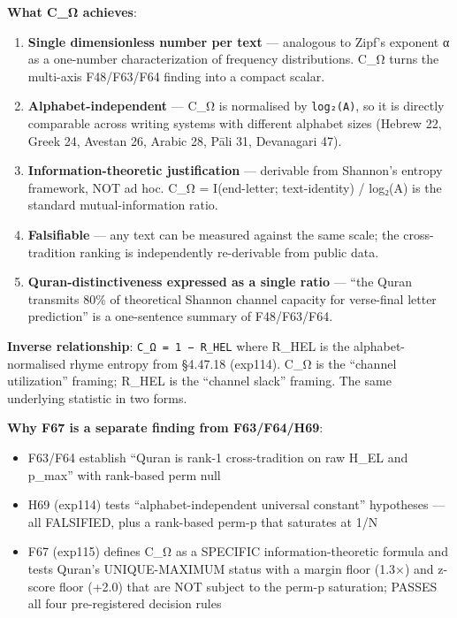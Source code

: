 \documentclass[
]{article}
\providecommand{\tightlist}{%
  \setlength{\itemsep}{0pt}\setlength{\parskip}{0pt}}
\begin{document}
\textbf{What C\_Ω achieves}:

\begin{enumerate}
\def\labelenumi{\arabic{enumi}.}
\item
  \textbf{Single dimensionless number per text} --- analogous to Zipf's
  exponent α as a one-number characterization of frequency
  distributions. C\_Ω turns the multi-axis F48/F63/F64 finding into a
  compact scalar.
\item
  \textbf{Alphabet-independent} --- C\_Ω is normalised by
  \texttt{log₂(A)}, so it is directly comparable across writing systems
  with different alphabet sizes (Hebrew 22, Greek 24, Avestan 26, Arabic
  28, Pāli 31, Devanagari 47).
\item
  \textbf{Information-theoretic justification} --- derivable from
  Shannon's entropy framework, NOT ad hoc. C\_Ω = I(end-letter;
  text-identity) / log₂(A) is the standard mutual-information ratio.
\item
  \textbf{Falsifiable} --- any text can be measured against the same
  scale; the cross-tradition ranking is independently re-derivable from
  public data.
\item
  \textbf{Quran-distinctiveness expressed as a single ratio} --- ``the
  Quran transmits 80\% of theoretical Shannon channel capacity for
  verse-final letter prediction'' is a one-sentence summary of
  F48/F63/F64.
\end{enumerate}

\textbf{Inverse relationship}: \texttt{C\_Ω\ =\ 1\ −\ R\_HEL} where
R\_HEL is the alphabet-normalised rhyme entropy from §4.47.18 (exp114).
C\_Ω is the ``channel utilization'' framing; R\_HEL is the ``channel
slack'' framing. The same underlying statistic in two forms.

\textbf{Why F67 is a separate finding from F63/F64/H69}:

\begin{itemize}
\tightlist
\item
  F63/F64 establish ``Quran is rank-1 cross-tradition on raw H\_EL and
  p\_max'' with rank-based perm null
\item
  H69 (exp114) tests ``alphabet-independent universal constant''
  hypotheses --- all FALSIFIED, plus a rank-based perm-p that saturates
  at 1/N
\item
  F67 (exp115) defines C\_Ω as a SPECIFIC information-theoretic formula
  and tests Quran's UNIQUE-MAXIMUM status with a margin floor (1.3×) and
  z-score floor (+2.0) that are NOT subject to the perm-p saturation;
  PASSES all four pre-registered decision rules
\end{itemize}
\end{document}
